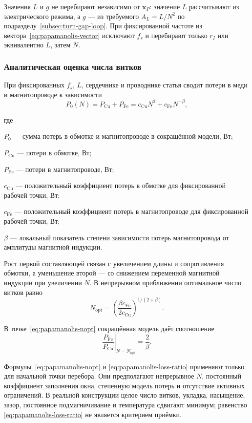 \documentclass[14pt,a4paper]{extarticle}
\newenvironment{whereblock}
 {\par\noindent где\par
  \begin{list}{}{\setlength{\leftmargin}{12.5mm}
                  \setlength{\itemindent}{-12.5mm}
                  \setlength{\itemsep}{0pt}
                  \setlength{\parsep}{0pt}
                  \setlength{\topsep}{0pt}}}
 {\end{list}}
\newcommand{\whereitem}[2]{\item[] #1 --- #2}
\begin{document}
Значения $L$ и $g$ не перебирают независимо от $\mathbf x_P$: значение
$L$ рассчитывают из электрического режима, а $g$ --- из требуемого
$A_L=L/N^2$ по подразделу~\ref{subsec:turn-gap-loop}. При фиксированной
частоте из вектора~\eqref{eq:papamanolis-vector} исключают $f_s$ и
перебирают только $r_I$ или эквивалентно $L$, затем $N$.

\subsubsection{Аналитическая оценка числа витков}

При фиксированных $f_s$, $L$, сердечнике и проводнике статья сводит
потери в меди и магнитопроводе к зависимости
\begin{equation}
 P_0(N)=P_{\text{Cu}}+P_{\text{Fe}}=
 c_{\text{Cu}}N^2+c_{\text{Fe}}N^{-\beta},
 \label{eq:papamanolis-reduced-loss}
\end{equation}
\begin{whereblock}
\whereitem{$P_0$}{сумма потерь в обмотке и магнитопроводе в сокращённой
модели, Вт;}
\whereitem{$P_{\text{Cu}}$}{потери в обмотке, Вт;}
\whereitem{$P_{\text{Fe}}$}{потери в магнитопроводе, Вт;}
\whereitem{$c_{\text{Cu}}$}{положительный коэффициент потерь в обмотке
для фиксированной рабочей точки, Вт;}
\whereitem{$c_{\text{Fe}}$}{положительный коэффициент потерь в
магнитопроводе для фиксированной рабочей точки, Вт;}
\whereitem{$\beta$}{локальный показатель степени зависимости потерь
магнитопровода от амплитуды магнитной индукции.}
\end{whereblock}

Рост первой составляющей связан с увеличением длины и сопротивления
обмотки, а уменьшение второй --- со снижением переменной магнитной
индукции при увеличении $N$. В непрерывном приближении оптимальное число
витков равно
\begin{equation}
 N_{\text{opt}}=
 \left(
 \frac{\beta c_{\text{Fe}}}
 {2c_{\text{Cu}}}
 \right)^{1/(2+\beta)}.
 \label{eq:papamanolis-nopt}
\end{equation}

В точке~\eqref{eq:papamanolis-nopt} сокращённая модель даёт соотношение
\begin{equation}
 \left.
 \frac{P_{\text{Fe}}}{P_{\text{Cu}}}
 \right|_{N=N_{\text{opt}}}
 =
 \frac{2}{\beta}.
 \label{eq:papamanolis-loss-ratio}
\end{equation}

Формулы~\eqref{eq:papamanolis-nopt} и
\eqref{eq:papamanolis-loss-ratio} применяют только для начальной точки
перебора. Они предполагают непрерывное $N$, постоянный коэффициент
заполнения окна, степенную модель потерь и отсутствие активных ограничений.
В реальной конструкции целое число витков, укладка, насыщение, зазор,
постоянное подмагничивание и температура сдвигают минимум; равенство
\eqref{eq:papamanolis-loss-ratio} не является критерием приёмки.
\end{document}
